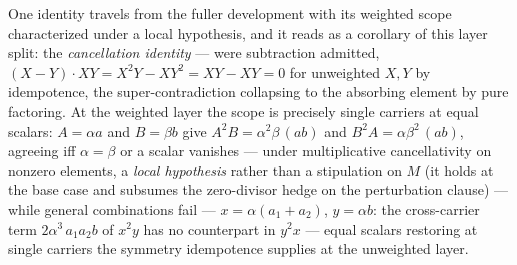 
One identity travels from the fuller development with its weighted scope characterized under a local hypothesis, and it reads as a corollary of this layer split: the \emph{cancellation identity} --- were subtraction admitted, $(X - Y)\cdot XY = X^2Y - XY^2 = XY - XY = 0$ for unweighted $X, Y$ by idempotence, the super-contradiction collapsing to the absorbing element by pure factoring. At the weighted layer the scope is precisely single carriers at equal scalars: $A = \alpha a$ and $B = \beta b$ give $A^2B = \alpha^2\beta\,(ab)$ and $B^2A = \alpha\beta^2\,(ab)$, agreeing iff $\alpha = \beta$ or a scalar vanishes --- under multiplicative cancellativity on nonzero elements, a \emph{local hypothesis} rather than a stipulation on $M$ (it holds at the base case and subsumes the zero-divisor hedge on the perturbation clause) --- while general combinations fail --- $x = \alpha(a_1 + a_2)$, $y = \alpha b$: the cross-carrier term $2\alpha^3\,a_1a_2b$ of $x^2y$ has no counterpart in $y^2x$ --- equal scalars restoring at single carriers the symmetry idempotence supplies at the unweighted layer.

